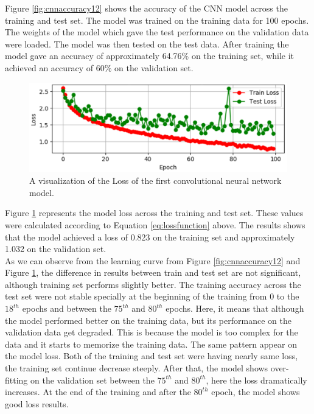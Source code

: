 Figure \ref{fig:cnnaccuracy12} shows the accuracy of the CNN model across the training and test set. The model was trained on the training data for 100 epochs. The weights of the model which gave the test performance on the validation data were loaded. The model was then tested on the test data. After training the model gave an accuracy of approximately 64.76\% on the training set, while it achieved an accuracy of 60\% on the validation set.


\begin{figure}[ht]
\centering
\includegraphics[width=1.0\columnwidth]{Figures/losscnnmodel}
\decoRule
\caption[A visualization of the Loss of the first convolutional neural network model.]{A visualization of the Loss of the first convolutional neural network model.}
\label{fig:cnnaccuracy13}
\end{figure}

Figure \ref{fig:cnnaccuracy13} represents the model loss across the training and test set. These values were calculated according to Equation \ref{eq:lossfunction} above. The results shows that the model achieved a loss of 0.823 on the training set and approximately 1.032 on the validation set.\\

As we can observe from the learning curve from Figure \ref{fig:cnnaccuracy12} and Figure \ref{fig:cnnaccuracy13}, the difference in results between train and test set are not significant, although training set performs slightly better. The training accuracy across the test set were not stable specially at the beginning of the training from 0 to the $18^{th}$ epochs and between the $75^{th}$ and $80^{th}$ epochs. Here, it means that although the model performed better on the training data, but its performance on the validation data get degraded. This is because the model is too complex for the data and it starts to memorize the training data. The same pattern appear on the model loss. Both of the training and test set were having nearly same loss, the training set continue decrease steeply. After that, the model shows over-fitting on the validation set between the $75^{th}$ and $80^{th}$, here the loss dramatically increases. At the end of the training  and after the $80^{th}$ epoch, the model shows good loss results.


